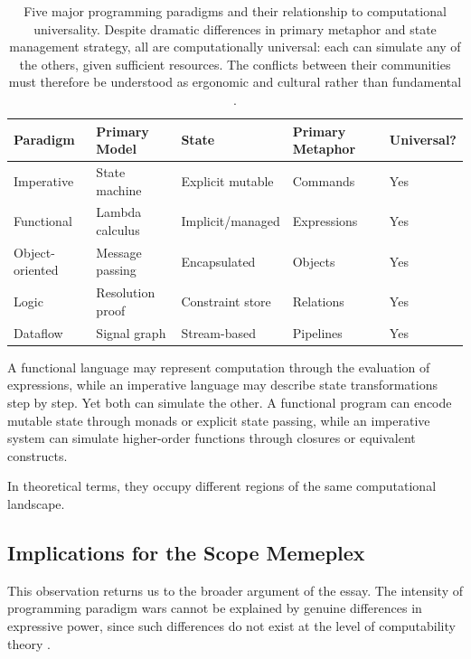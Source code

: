\documentclass[12pt]{article}
\theoremstyle{definition}
\begin{document}
\begin{table}[h]
\centering
\small
\begin{tabular}{lllll}
\toprule
\textbf{Paradigm} & \textbf{Primary Model} & \textbf{State} &
  \textbf{Primary Metaphor} & \textbf{Universal?} \\
\midrule
Imperative       & State machine       & Explicit mutable & Commands          & Yes \\
Functional       & Lambda calculus     & Implicit/managed & Expressions       & Yes \\
Object-oriented  & Message passing     & Encapsulated     & Objects           & Yes \\
Logic            & Resolution proof    & Constraint store & Relations         & Yes \\
Dataflow         & Signal graph        & Stream-based     & Pipelines         & Yes \\
\bottomrule
\end{tabular}
\caption{Five major programming paradigms and their relationship to
computational universality. Despite dramatic differences in primary
metaphor and state management strategy, all are computationally
universal: each can simulate any of the others, given sufficient
resources. The conflicts between their communities must therefore be
understood as ergonomic and cultural rather than fundamental
\cite{backus1978,kleene1952}.}
\label{tab:paradigms}
\end{table}

A functional language may represent computation through the evaluation
of expressions, while an imperative language may describe state
transformations step by step. Yet both can simulate the other. A
functional program can encode mutable state through monads or explicit
state passing, while an imperative system can simulate higher-order
functions through closures or equivalent constructs.

In theoretical terms, they occupy different regions of the same
computational landscape.

\subsection{Implications for the Scope Memeplex}

This observation returns us to the broader argument of the essay. The
intensity of programming paradigm wars cannot be explained by genuine
differences in expressive power, since such differences do not exist at
the level of computability theory \cite{kleene1952}.
\end{document}
